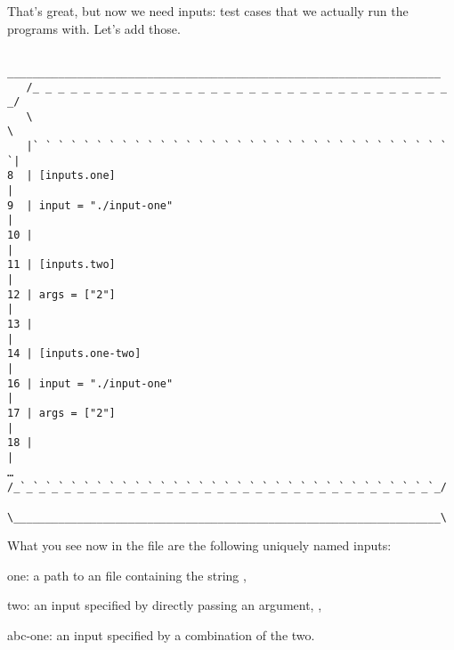 \documentclass[a4paper,english]{article}
\begin{document}
\begin{adjustwidth}{18pt}{0pt}
%
%

    That's great, but now we need inputs: test cases that we actually run the
    programs with.
    Let's add those.

    \begin{verbatim}
    ____________________________________________________________________
   /_ _ _ _ _ _ _ _ _ _ _ _ _ _ _ _ _ _ _ _ _ _ _ _ _ _ _ _ _ _ _ _ _ _/
   \                                                                   \
   |` ` ` ` ` ` ` ` ` ` ` ` ` ` ` ` ` ` ` ` ` ` ` ` ` ` ` ` ` ` ` ` ` `|
8  | [inputs.one]                                                      |
9  | input = "./input-one"                                             |
10 |                                                                   |
11 | [inputs.two]                                                      |
12 | args = ["2"]                                                      |
13 |                                                                   |
14 | [inputs.one-two]                                                  |
16 | input = "./input-one"                                             |
17 | args = ["2"]                                                      |
18 |                                                                   |
…  /_`_`_`_`_`_`_`_`_`_`_`_`_`_`_`_`_`_`_`_`_`_`_`_`_`_`_`_`_`_`_`_`_`_/
   \___________________________________________________________________\

    \end{verbatim}

    What you see now in the file are the following uniquely named inputs:
    \begin{Description}[inputs]\setlength{\itemsep}{0cm}
    \item[one:] a path to an  file containing the string ,
    \item[two:] an input specified by directly passing an argument, \File{"2"},
    \item[abc-one:] an input specified by a combination of the two.
    \end{Description}


\end{adjustwidth}
\end{document}
